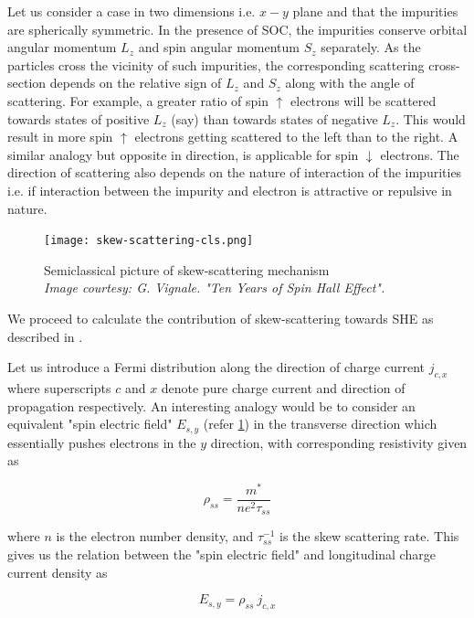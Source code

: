 Let us consider a case in two dimensions i.e. \( x-y \) plane and that the impurities are spherically symmetric.
In the presence of SOC, the impurities conserve orbital angular momentum \( L_z \) and spin angular momentum \( S_z \) separately.
As the particles cross the vicinity of such impurities, the corresponding scattering cross-section depends on the relative sign of \( L_z \) and \( S_z \) along with the angle of scattering.
For example, a greater ratio of spin \( \uparrow \) electrons will be scattered towards states of positive \( L_z \) (say) than towards states of negative \( L_z \).
This would result in more spin \( \uparrow \) electrons getting scattered to the left than to the right.
A similar analogy but opposite in direction, is applicable for spin \( \downarrow \) electrons.
The direction of scattering also depends on the nature of interaction of the impurities i.e. if interaction between the impurity and electron is attractive or repulsive in nature.

\begin{figure}[h!]
    \centering
    \texttt{[image: skew-scattering-cls.png]}
    \caption{Semiclassical picture of skew-scattering mechanism\\ \vspace{0.2cm} \emph{Image courtesy: G. Vignale. "Ten Years of Spin Hall Effect".} }
    \label{fig:semiskew}
\end{figure}

We proceed to calculate the contribution of skew-scattering towards SHE as described in \cite{Vignale_2009}.

Let us introduce a Fermi distribution along the direction of charge current \( j_{c,x} \) where superscripts \( c \) and \( x \) denote pure charge current and direction of propagation respectively.
An interesting analogy would be to consider an equivalent "spin electric field" \( E_{s,y} \) (refer \cref{fig:semiskew}) in the transverse direction which essentially pushes electrons in the \( y \) direction, with corresponding resistivity given as

\begin{equation*}
    \rho_{ss} = \frac{m^*}{ne^2 \tau_{ss}}
\end{equation*}

where \( n \) is the electron number density, and \( \tau_{ss}^{-1} \) is the skew scattering rate.
This gives us the relation between the "spin electric field" and longitudinal charge current density as

\begin{equation} \label{eq:spin-rho}
    E_{s,y} = \rho_{ss} \: j_{c,x}
\end{equation}

